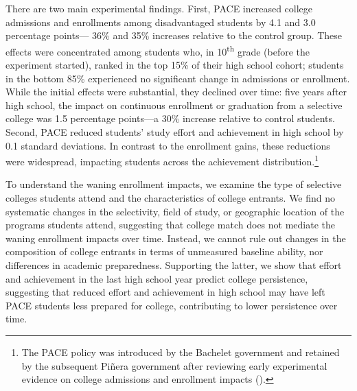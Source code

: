 There are two main experimental findings. First, PACE increased college admissions and enrollments among disadvantaged students by 4.1 and 3.0 percentage points— 36\% and 35\% increases relative to the control group. These effects were concentrated among students who, in 10\textsuperscript{th} grade (before the experiment started), ranked in the top 15\% of their high school cohort; students in the bottom 85\% experienced no significant change in admissions or enrollment. While the initial effects were substantial, they declined over time: five years after high school, the impact on continuous enrollment or graduation from a selective college was 1.5 percentage points—a 30\% increase relative to control students. Second, PACE reduced students’ study effort and achievement in high school by 0.1 standard deviations. In contrast to the enrollment gains, these reductions were widespread, impacting students across the achievement distribution.\footnote{The PACE policy was introduced by the Bachelet government and retained by the subsequent Pi\~{n}era government after reviewing early experimental evidence on college admissions and enrollment impacts (\citet*{evaluacion_mineduc_2019}).} \par 




To understand the waning enrollment impacts, we examine the type of selective colleges students attend and the characteristics of college entrants. We find no systematic changes in the selectivity, field of study, or geographic location of the programs students attend, suggesting that college match does not mediate the waning enrollment impacts over time. Instead, we cannot rule out changes in the composition of college entrants in terms of unmeasured baseline ability, nor differences in academic preparedness. Supporting the latter, we show that effort and achievement in the last high school year predict college persistence, suggesting that reduced effort and achievement in high school may have left PACE students less prepared for college, contributing to lower persistence over time.\par 

